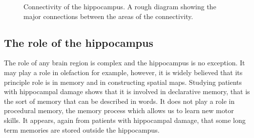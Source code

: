 \documentclass[11pt,a4paper]{scrartcl}
\begin{document}
\begin{figure}
\caption{Connectivity of the hippocampus. A rough diagram showing the major connections between the areas of the connectivity.\label{fig:connectivity}}
\end{figure}

\subsection*{The role of the hippocampus}
The role of any brain region is complex and the hippocampus is no
exception. It may play a role in olefaction for example, however, it
is widely believed that its principle role is in memory and in
constructing spatial maps. Studying patients with hippocampal damage
shows that it is involved in declarative memory, that is the sort of
memory that can be described in words. It does not play a role in
procedural memory, the memory process which allows us to learn new
motor skills. It appears, again from patients with hippocampal damage,
that some long term memories are stored outside the hippocampus.
\end{document}
